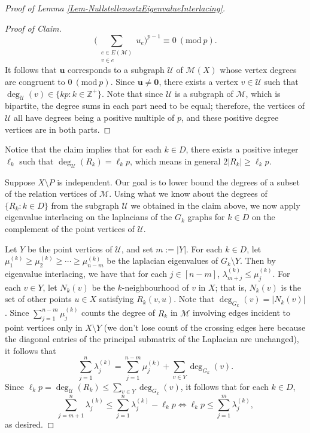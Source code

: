 \documentclass[12pt]{article}
\newcommand{\Z}{\mathbb{Z}}
\newcommand{\Mod}[1]{\ (\mathrm{mod}\ #1)}
\theoremstyle{definition}
\begin{document}
\begin{proof}[Proof of Lemma \ref{Lem-NullstellensatzEigenvalueInterlacing}]
\begin{proof}[Proof of Claim]
				$$\Big(\sum_{\substack{e \in E(\mathcal{M})\\ v \in e}}u_e \Big)^{p-1} \equiv 0 \Mod{p}.$$  
				It follows that $\mathbf{u}$ corresponds to a subgraph $\mathcal{U}$ of $\mathcal{M}(X)$ whose vertex degrees are congruent to $0 \Mod{p}$.  Since $\mathbf{u} \neq \mathbf{0}$, there exists a vertex $v \in \mathcal{U}$ such that $\deg_{\mathcal{U}}(v) \in \{kp: k \in \Z^+\}$.  Note that since $\mathcal{U}$ is a subgraph of $\mathcal{M}$, which is bipartite, the degree sums in each part need to be equal; therefore, the vertices of $\mathcal{U}$ all have degrees being a positive multiple of $p$, and these positive degree vertices are in both parts. \qedhere
			\end{proof}
		Notice that the claim implies that for each $k \in D$, there exists a positive integer $\ell_k$ such that $\deg_{\mathcal{U}}(R_k) = \ell_k p$, which means in general $2|R_k| \geq \ell_k p$.  
		
		Suppose $X \setminus P$ is independent.  Our goal is to lower bound the degrees of a subset of the relation vertices of $\mathcal{M}$.  Using what we know about the degrees of $\{R_k: k \in D\}$ from the subgraph $\mathcal{U}$ we obtained in the claim above, we now apply eigenvalue interlacing on the laplacians of the $G_k$ graphs for $k \in D$ on the complement of the point vertices of $\mathcal{U}$.
		
		Let $Y$ be the point vertices of $\mathcal{U}$, and set $m := |Y|$.  For each $k \in D$, let $\mu_{1}^{(k)} \geq \mu_2^{(k)} \geq \cdots \geq \mu_{n-m}^{(k)}$ be the laplacian eigenvalues of $G_k \setminus Y$.  Then by eigenvalue interlacing, we have that for each $j \in [n-m]$, $\lambda_{m+j}^{(k)} \leq \mu_j^{(k)}$.  For each $v \in Y$, let $N_k(v)$ be the $k$-neighbourhood of $v$ in $X$; that is, $N_k(v)$ is the set of other points $u \in X$ satisfying $R_k(v,u)$.  Note that $\deg_{G_k}(v) = |N_k(v)|$.  Since $\sum_{j=1}^{n-m} \mu_j^{(k)}$ counts the degree of $R_k$ in $\mathcal{M}$ involving edges incident to point vertices only in $X \setminus Y$ (we don't lose count of the crossing edges here because the diagonal entries of the principal submatrix of the Laplacian are unchanged), it follows that
		$$\sum_{j=1}^n \lambda_{j}^{(k)} = \sum_{j=1}^{n-m} \mu_j^{(k)} + \sum_{v \in Y} \deg_{G_k}(v).$$
		Since $\ell_k p = \deg_{\mathcal{U}}(R_k) \leq \sum_{v\in Y} \deg_{G_k}(v)$, it follows that for each $k \in D$,
		$$\sum_{j=m+1}^n \lambda_j^{(k)} \leq \sum_{j=1}^n \lambda_j^{(k)} - \ell_kp \Leftrightarrow \ell_k p \leq \sum_{j=1}^m \lambda_j^{(k)},$$
		as desired.
	\end{proof}
	
\end{document}
